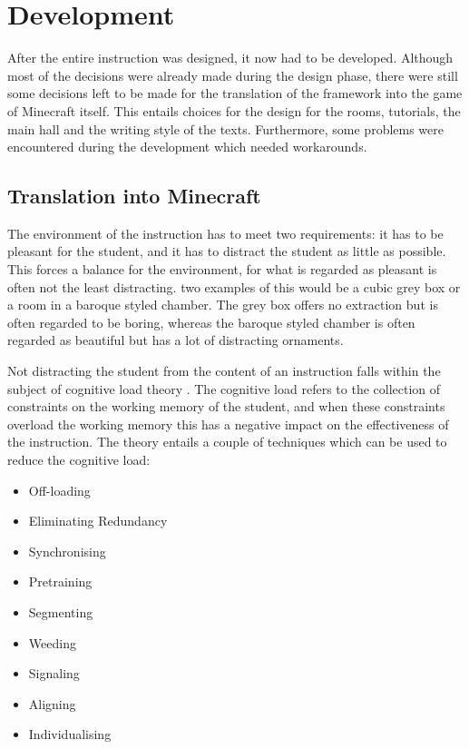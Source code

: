 \documentclass[11pt,twoside]{report} %
\begin{document}

\part{Development}
\thispagestyle{fancy}

After the entire instruction was designed, it now had to be developed. Although most of the decisions were already made during the design phase, there were still some decisions left to be made for the translation of the framework into the game of Minecraft itself. This entails choices for the design for the rooms, tutorials, the main hall and the writing style of the texts. Furthermore, some problems were encountered during the development which needed workarounds.

\chapter{Translation into Minecraft}

The environment of the instruction has to meet two requirements: it has to be pleasant for the student, and it has to distract the student as little as possible. This forces a balance for the environment, for what is regarded as pleasant is often not the least distracting. two examples of this would be a cubic grey box or a room in a baroque styled chamber. The grey box offers no extraction but is often regarded to be boring, whereas the baroque styled chamber is often regarded as beautiful but has a lot of distracting ornaments.

Not distracting the student from the content of an instruction falls within the subject of cognitive load theory \cite{smithragan}. The cognitive load refers to the collection of constraints on the working memory of the student, and when these constraints overload the working memory this has a negative impact on the effectiveness of the instruction. The theory entails a couple of techniques which can be used to reduce the cognitive load:

\begin{itemize}
	\item Off-loading
	\item Eliminating Redundancy
	\item Synchronising
	\item Pretraining
	\item Segmenting
	\item Weeding
	\item Signaling
	\item Aligning
	\item Individualising
\end{itemize}
\end{document}
